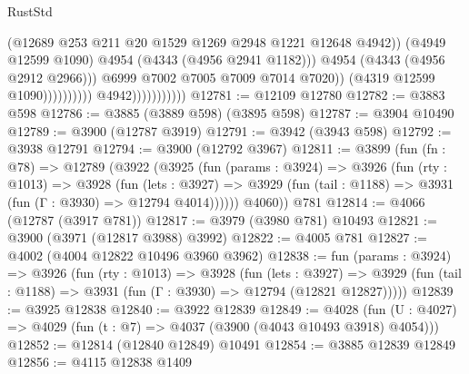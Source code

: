 \begin{lexlean}{RustStd}
\begin{coremodule}
                                                      (@12689
                                                        @253
                                                        @211
                                                        @20
                                                        @1529
                                                        @1269
                                                        @2948
                                                        @1221
                                                        @12648
                                                        @4942))
                                                    (@4949 @12599 @1090)
                                                    @4954
                                                    (@4343 (@4956 @2941 @1182)))
                                                  @4954
                                                  (@4343 (@4956 @2912 @2966)))
                                                @6999
                                                @7002
                                                @7005
                                                @7009
                                                @7014
                                                @7020))
                                            (@4319 @12599 @1090))))))))))
                          @4942)))))))))))
@12781 := @12109 @12780
@12782 := @3883 @598
@12786 := @3885 (@3889 @598) (@3895 @598)
@12787 := @3904 @10490
@12789 := @3900 (@12787 @3919)
@12791 := @3942 (@3943 @598)
@12792 := @3938 @12791
@12794 := @3900 (@12792 @3967)
@12811 := @3899
    (fun (fn : @78) =>
    @12789
      (@3922
        (@3925
          (fun (params : @3924) =>
          @3926
            (fun (rty : @1013) =>
            @3928
              (fun (lets : @3927) =>
              @3929 (fun (tail : @1188) => @3931 (fun (Γ : @3930) => @12794 @4014))))))
        @4060))
    @781
@12814 := @4066 (@12787 (@3917 @781))
@12817 := @3979 (@3980 @781) @10493
@12821 := @3900 (@3971 (@12817 @3988) @3992)
@12822 := @4005 @781
@12827 := @4002 (@4004 @12822 @10496 @3960 @3962)
@12838 := fun (params : @3924) =>
  @3926
    (fun (rty : @1013) =>
    @3928
      (fun (lets : @3927) =>
      @3929 (fun (tail : @1188) => @3931 (fun (Γ : @3930) => @12794 (@12821 @12827)))))
@12839 := @3925 @12838
@12840 := @3922 @12839
@12849 := @4028
    (fun (U : @4027) => @4029 (fun (t : @7) => @4037 (@3900 (@4043 @10493 @3918) @4054)))
@12852 := @12814 (@12840 @12849) @10491
@12854 := @3885 @12839 @12849
@12856 := @4115 @12838 @1409

\end{coremodule}
\end{lexlean}
